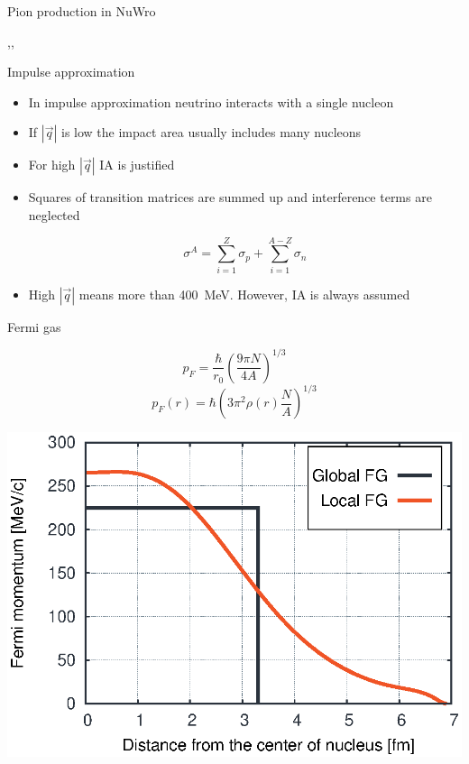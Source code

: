 \begin{slide}[toc=$\pi$ production]{Pion production in NuWro}
\null\vfill

  \centering

  \sep\sep
  

\vfill\null
\end{slide}


\begin{slide}{Impulse approximation}
\null\vfill

  \twocolumn
  {
    \begin{itemize}
      \item In impulse approximation neutrino interacts with a single nucleon
      \item If $|\vec q|$ is low the impact area usually includes many nucleons
      \item For high $|\vec q|$ IA is justified
    \end{itemize}    
  }
  {
    \centering\scalebox{0.5}{}
  }
  
  \begin{itemize}
    \item Squares of transition matrices are summed up and interference terms are neglected
  
    $$\sigma^A = \sum\limits_{i = 1}^Z \sigma_p + \sum\limits_{i = 1}^{A - Z}\sigma_n$$
    
    \item High $|\vec q|$ means more than 400~MeV. However, IA is always assumed
  \end{itemize}
  
\vfill\null
\end{slide}


\begin{slide}{Fermi gas}
\null\vfill

  \twocolumn
  {
  }
  {
    \vspace*{-10pt}
    
  }
  \twocolumn
  {
    $$p_F = \frac{\hbar}{r_0}\left(\frac{9\pi N}{4A}\right)^{1/3}$$  
  }
  {
    $$p_F(r) = \hbar\left(3\pi^2\rho(r) \frac{N}{A}\right)^{1/3}$$  
  }
  
  \centering\includegraphics[width=0.5\columnwidth]{img/fermigas.eps}
  
\vfill\null
\end{slide}

